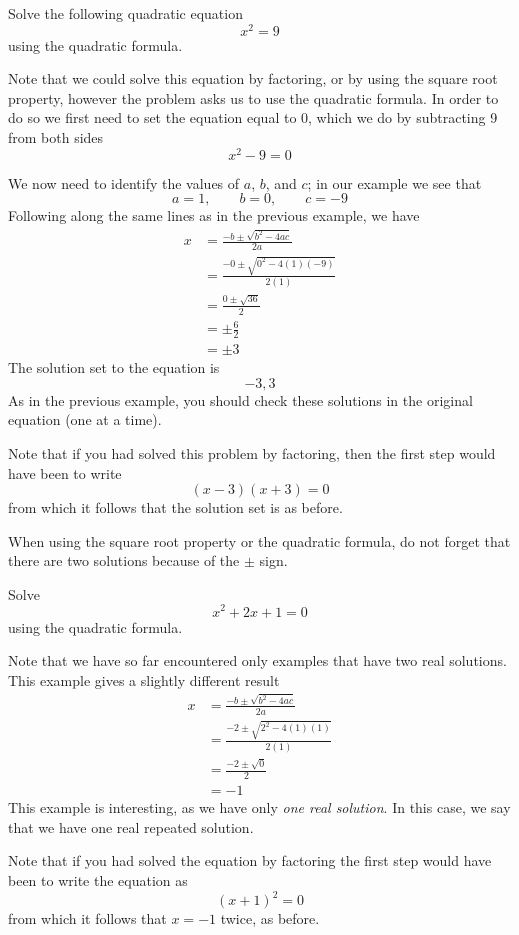 \begin{myexample}\label{ex:quadform1}
Solve the following quadratic equation
\[
	x^2=9 
\]
using the quadratic formula.
\end{myexample}
\begin{myProof}
	Note that we could solve this equation by factoring, or by using the square root property, however
	the problem asks us to use the quadratic formula. In order to do so we first need to set the equation
	equal to 0, which we do by subtracting 9 from both sides
	\[
		x^2-9 = 0
	\]
				
	We now need to identify the values of $a$, $b$, and $c$; in our example we see that
	\[
		a = 1, \qquad b=0, \qquad c = -9
	\] 
	Following along the same lines as in the previous example, we have
	\begin{align*}
		x & =  \frac{-b\pm \sqrt{b^2-4ac}}{2a}       \\
		  & =  \frac{-0\pm\sqrt{0^2-4(1)(-9)}}{2(1)} \\
		  & =  \frac{0\pm\sqrt{36}}{2}               \\
		  & = \pm\frac{6}{2}                         \\
		  & = \pm 3                                  
	\end{align*} 
	The solution set to the equation is
	\[
		{-3,3}
	\]
	As in the previous example, you should check these solutions in the original equation (one at a time). 
				
	Note that if you had solved this problem by factoring, then the first step would have been to write
	\[
		(x-3)(x+3)=0
	\]
	from which it follows that the solution set is as before.
				
\end{myProof} 
\begin{myDefinition}
	When using the square root property or the quadratic formula, do not forget that
	there are two solutions because of the $\pm$ sign.
\end{myDefinition} 

\begin{myexample}
Solve
\[
	x^2+2x+1=0
\]
using the quadratic formula.
\end{myexample}
\begin{myProof}
	Note that we have so far encountered only examples that have two real solutions. This example gives a slightly
	different result
	\begin{align*}
		x & =  \frac{-b\pm \sqrt{b^2-4ac}}{2a}      \\
		  & =  \frac{-2\pm\sqrt{2^2-4(1)(1)}}{2(1)} \\
		  & =  \frac{-2\pm\sqrt{0}}{2}              \\
		  & =  -1                                   
	\end{align*}
	This example is interesting, as we have only {\em one real solution}. In this case, we say that we have one real
	repeated solution.
				
	Note that if you had solved the equation by factoring the first step would have been to write the equation as
	\[
		(x+1)^2=0
	\]
	from which it follows that $x=-1$ twice, as before.
\end{myProof} 

